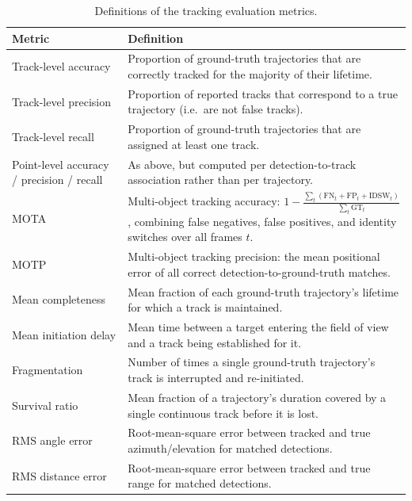 \begin{table}[htbp]
    \centering
    \caption{Definitions of the tracking evaluation metrics.}
    \label{tab:tracking-metrics}
    \begin{tabularx}{\linewidth}{l X}
        \hline
        Metric & Definition \\
        \hline
        Track-level accuracy & Proportion of ground-truth trajectories that are
        correctly tracked for the majority of their lifetime. \\
        Track-level precision & Proportion of reported tracks that correspond to a
        true trajectory (i.e.\ are not false tracks). \\
        Track-level recall & Proportion of ground-truth trajectories that are
        assigned at least one track. \\
        Point-level accuracy / precision / recall & As above, but computed per
        detection-to-track association rather than per trajectory. \\
        MOTA & Multi-object tracking accuracy: $1 - \frac{\sum_t (\text{FN}_t +
        \text{FP}_t + \text{IDSW}_t)}{\sum_t \text{GT}_t}$, combining false
        negatives, false positives, and identity switches over all frames $t$. \\
        MOTP & Multi-object tracking precision: the mean positional error of all
        correct detection-to-ground-truth matches. \\
        Mean completeness & Mean fraction of each ground-truth trajectory's lifetime
        for which a track is maintained. \\
        Mean initiation delay & Mean time between a target entering the field of view
        and a track being established for it. \\
        Fragmentation & Number of times a single ground-truth trajectory's track is
        interrupted and re-initiated. \\
        Survival ratio & Mean fraction of a trajectory's duration covered by a single
        continuous track before it is lost. \\
        RMS angle error & Root-mean-square error between tracked and true
        azimuth/elevation for matched detections. \\
        RMS distance error & Root-mean-square error between tracked and true range for
        matched detections. \\
        \hline
    \end{tabularx}
\end{table}

